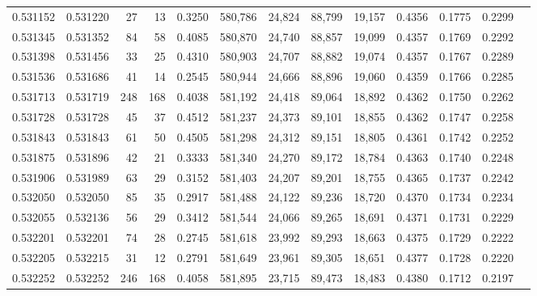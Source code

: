 \begin{tabular}{rrrrrrrrrrrrr}
0.531152 & 0.531220 &    27 &    13 &                                     0.3250 & 580,786 &  24,824 &  88,799 &  19,157 & 0.4356 & 0.1775 & 0.2299 \\
0.531345 & 0.531352 &    84 &    58 &                                     0.4085 & 580,870 &  24,740 &  88,857 &  19,099 & 0.4357 & 0.1769 & 0.2292 \\
0.531398 & 0.531456 &    33 &    25 &                                     0.4310 & 580,903 &  24,707 &  88,882 &  19,074 & 0.4357 & 0.1767 & 0.2289 \\
0.531536 & 0.531686 &    41 &    14 &                                     0.2545 & 580,944 &  24,666 &  88,896 &  19,060 & 0.4359 & 0.1766 & 0.2285 \\
0.531713 & 0.531719 &   248 &   168 &                                     0.4038 & 581,192 &  24,418 &  89,064 &  18,892 & 0.4362 & 0.1750 & 0.2262 \\
0.531728 & 0.531728 &    45 &    37 &                                     0.4512 & 581,237 &  24,373 &  89,101 &  18,855 & 0.4362 & 0.1747 & 0.2258 \\
0.531843 & 0.531843 &    61 &    50 &                                     0.4505 & 581,298 &  24,312 &  89,151 &  18,805 & 0.4361 & 0.1742 & 0.2252 \\
0.531875 & 0.531896 &    42 &    21 &                                     0.3333 & 581,340 &  24,270 &  89,172 &  18,784 & 0.4363 & 0.1740 & 0.2248 \\
0.531906 & 0.531989 &    63 &    29 &                                     0.3152 & 581,403 &  24,207 &  89,201 &  18,755 & 0.4365 & 0.1737 & 0.2242 \\
0.532050 & 0.532050 &    85 &    35 &                                     0.2917 & 581,488 &  24,122 &  89,236 &  18,720 & 0.4370 & 0.1734 & 0.2234 \\
0.532055 & 0.532136 &    56 &    29 &                                     0.3412 & 581,544 &  24,066 &  89,265 &  18,691 & 0.4371 & 0.1731 & 0.2229 \\
0.532201 & 0.532201 &    74 &    28 &                                     0.2745 & 581,618 &  23,992 &  89,293 &  18,663 & 0.4375 & 0.1729 & 0.2222 \\
0.532205 & 0.532215 &    31 &    12 &                                     0.2791 & 581,649 &  23,961 &  89,305 &  18,651 & 0.4377 & 0.1728 & 0.2220 \\
0.532252 & 0.532252 &   246 &   168 &                                     0.4058 & 581,895 &  23,715 &  89,473 &  18,483 & 0.4380 & 0.1712 & 0.2197 \\

\end{tabular}
